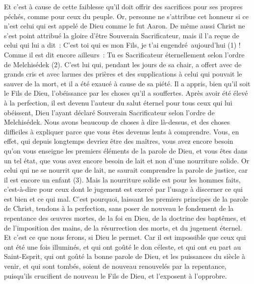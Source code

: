 \begin{multicols}{2}
Et c’est à cause de cette faiblesse qu’il doit offrir des sacrifices pour ses propres péchés, comme pour ceux du peuple.
Or, personne ne s'attribue cet honneur si ce n’est celui qui est appelé de Dieu comme le fut Aaron.
De même aussi Christ ne s'est point attribué la gloire d’être Souverain Sacrificateur, mais il l’a reçue de celui qui lui a dit : C’est toi qui es mon Fils, je t'ai engendré aujourd'hui (1) !
Comme il est dit encore ailleurs : Tu es Sacrificateur éternellement selon l'ordre de Melchisédek (2).
C’est lui qui, pendant les jours de sa chair, a offert avec de grands cris et avec larmes des prières et des supplications à celui qui pouvait le sauver de la mort, et il a été exaucé à cause de sa piété.
Il a appris, bien qu’il soit le Fils de Dieu, l'obéissance par les choses qu'il a souffertes.
Après avoir été élevé à la perfection, il est devenu l'auteur du salut éternel pour tous ceux qui lui obéissent,
Dieu l’ayant déclaré Souverain Sacrificateur selon l'ordre de Melchisédek.
Nous avons beaucoup de choses à dire là-dessus, et des choses difficiles à expliquer parce que vous êtes devenus lents à comprendre.
Vous, en effet, qui depuis longtemps devriez être des maîtres, vous avez encore besoin qu'on vous enseigne les premiers éléments de la parole de Dieu, et vous êtes dans un tel état, que vous avez encore besoin de lait et non d’une nourriture solide.
Or celui qui ne se nourrit que de lait, ne saurait comprendre la parole de justice, car il est encore un enfant (3).
Mais la nourriture solide est pour les hommes faits, c'est-à-dire pour ceux dont le jugement est exercé par l’usage à discerner ce qui est bien et ce qui mal.
\VerseOne{}C'est pourquoi, laissant les premiers principes de la parole de Christ, tendons à la perfection, sans poser de nouveau le fondement de la repentance des œuvres mortes,
de la foi en Dieu, de la doctrine des baptêmes, et de l'imposition des mains, de la résurrection des morts, et du jugement éternel.
Et c'est ce que nous ferons, si Dieu le permet.
Car il est impossible que ceux qui ont été une fois illuminés, et qui ont goûté le don céleste, et qui ont eu part au Saint-Esprit,
qui ont goûté la bonne parole de Dieu, et les puissances du siècle à venir,
et qui sont tombés, soient de nouveau renouvelés par la repentance, puisqu’ils crucifient de nouveau le Fils de Dieu, et l'exposent à l'opprobre.

\end{multicols}
